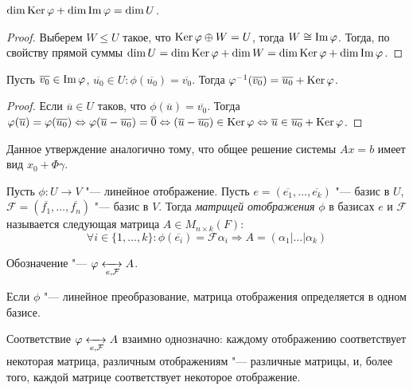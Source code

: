 \begin{theorem}
	$\dim{\ke{\phi}} + \dim{\im{\phi}} = \dim{U}$.
\end{theorem}

\begin{proof}
	Выберем $W \le U$ такое, что $\ke{\phi} \oplus W = U$, тогда $W \cong \im{\phi}$. Тогда, по свойству прямой суммы $\dim{U} = \dim{\ke{\phi}} \hm{+} \dim{W} = \dim{\ke{\phi}} + \dim{\im{\phi}}$.
\end{proof}

\begin{proposition}
	Пусть $\overline{v_0} \in \im{\phi}$, $\overline{u_0} \in U: \phi(\overline{u_0}) = \overline{v_0}$. Тогда $\phi^{-1}(\overline{v_0}) = \overline{u_0} + \ke{\phi}$.
\end{proposition}

\begin{proof}
	Если $\overline{u} \in U$ таков, что $\phi(\overline{u}) = \overline{v_0}$. Тогда $\phi(\overline{u}) \hm{=} \phi(\overline{u_0}) \Leftrightarrow \phi(\overline{u} - \overline{u_0}) = \overline{0} \Leftrightarrow (\overline{u} - \overline{u_0}) \in \ke{\phi} \Leftrightarrow \overline{u} \in \overline{u_0} + \ke{\phi}$.
\end{proof}

\begin{note}
	Данное утверждение аналогично тому, что общее решение системы $Ax = b$ имеет вид $x_0 + \Phi\gamma$.
\end{note}

\begin{definition}
	Пусть $\phi: U \rightarrow V$ "--- линейное отображение. Пусть $e = (\overline{e_1}, \dots, \overline{e_k})$ "--- базис в $U$, $\mathcal{F} = (\overline{f_1}, \dots, \overline{f_n})$ "--- базис в $V$. Тогда \textit{матрицей отображения} $\phi$ в базисах $e$ и $\mathcal{F}$ называется следующая матрица $A \in M_{n \times k}(F)$:
	\[\forall i \in \{1, \dots, k\}: \phi(\overline{e_i}) = \mathcal{F}\alpha_i \Rightarrow A = (\alpha_1|\dots|\alpha_k)\]
	
	Обозначение "--- $\phi \xleftrightarrow[e, \mathcal{F}]{} A$.
\end{definition}

\begin{note}
	Если $\phi$ "--- линейное преобразование, матрица отображения определяется в одном базисе.
\end{note}

\begin{note}
	Соответствие $\phi \xleftrightarrow[e, \mathcal{F}]{} A$ взаимно однозначно: каждому отображению соответствует некоторая матрица, различным отображениям "--- различные матрицы, и, более того, каждой матрице соответствует некоторое отображение.
\end{note}

